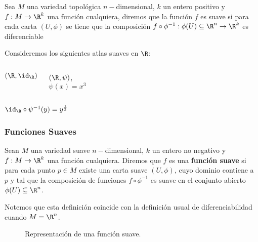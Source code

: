 \begin{frame}
\begin{definition}
  Sea $M$ una variedad topológica $n-$dimensional, $k$ un entero positivo y $f: M \to \R^{k}$ una función cualquiera, diremos que la función $f$ es suave si para cada carta $(U,\phi)$ se tiene que la composición $f \circ \phi^{-1}: \phi(U) \subseteq \R^n \to \R^k$ es diferenciable
\end{definition} \pause

\vspace{12pt}
\centering
Consideremos los siguientes atlas suaves en $\R$: 
\begin{columns}[t]
  \begin{tcolorbox}[height=45pt]
    \centering
    \vspace{5pt}
    $(\R, \id_{\R})$
  \end{tcolorbox}
  \begin{tcolorbox}[height=45pt]
    \centering
    $(\R, \psi)$,\\
    $\psi(x) = x^3$
  \end{tcolorbox}
  \centering
\end{columns} \pause

  \begin{tcolorbox}[width=0.3\linewidth, colframe=red]
  \centering
  $ \id_{\R} \circ \psi^{-1}(y) = y^{\frac{1}{3}}$
  \end{tcolorbox}
\end{frame}

\begin{frame}
  \frametitle{Funciones Suaves}
  \begin{definition}
    Sean $M$ una variedad suave  $n-$dimensional, $k$ un entero no negativo y $f: M \to \R^{k}$ una función cualquiera. Diremos que $f$ es una \textbf{función suave} si para cada punto $p \in M$ existe una carta suave $(U,\phi)$, cuyo dominio contiene a $p$ y tal que la composición de funciones $f \circ \phi^{-1}$ es suave en el conjunto abierto $\phi(U) \subseteq \R^{n}$.
  \end{definition} \pause

  Notemos que esta definición coincide con la definición usual de diferenciabilidad cuando $M = \R^n$.
\end{frame}

\begin{frame}
  \begin{figure}
    
    \caption{Representación de una función suave.}
  \end{figure}
\end{frame}


